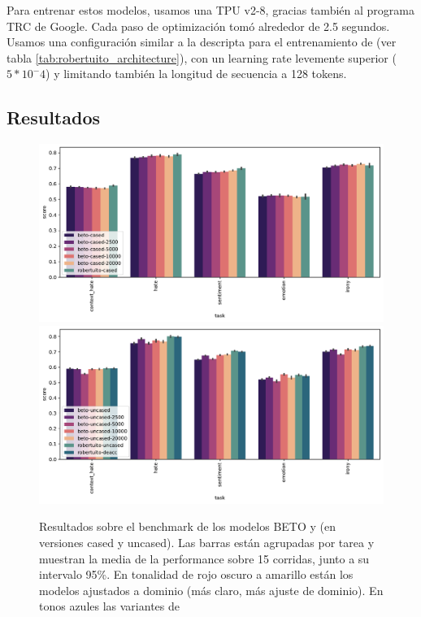 Para entrenar estos modelos, usamos una TPU v2-8, gracias también al programa TRC de Google. Cada paso de optimización tomó alrededor de 2.5 segundos. Usamos una configuración similar a la descripta para el entrenamiento de \robertuito{} (ver tabla \ref{tab:robertuito_architecture}), con un learning rate levemente superior ($5 * 10^-4$) y limitando también la longitud de secuencia a 128 tokens.

\subsection{Resultados}
\label{sec:domain_adaptation_results}


\begin{figure}
    \centering
    \includegraphics[width=\textwidth]{img/robertuito/results_cased_models.pdf}
    \includegraphics[width=\textwidth]{img/robertuito/results_uncased_models.pdf}

    \caption{Resultados sobre el benchmark de los modelos BETO y \robertuito{} (en versiones cased y uncased). Las barras están agrupadas por tarea y muestran la media de la performance sobre 15 corridas, junto a su intervalo 95\%. En tonalidad de rojo oscuro a amarillo están los modelos ajustados a dominio (más claro, más ajuste de dominio). En tonos azules las variantes de \robertuito{}}
    \label{fig:robertuito_vs_domain_barplot_results}
\end{figure}


